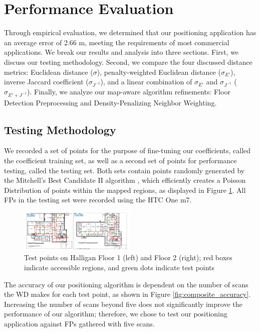 \documentclass[conference]{IEEEtran}
\begin{document}
\section{Performance Evaluation}

Through empirical evaluation, we determined that our positioning application has an average error of 2.66 m, meeting the requirements of most commercial applications. We break our results and analysis into three sections. First, we discuss our testing methodology. Second, we compare the four discussed distance metrics: Euclidean distance ($\sigma$), penalty-weighted Euclidean distance ($\sigma_{E'}$), inverse Jaccard coefficient ($\sigma_{J^{-1}}$), and a linear combination of $\sigma_{E'}$ and $\sigma_{J^{-1}}$ ($\sigma_{E' + J^{-1}}$). Finally, we analyze our map-aware algorithm refinements: Floor Detection Preprocessing and Density-Penalizing Neighbor Weighting.

\subsection{Testing Methodology}
We recorded a set of points for the purpose of fine-tuning our coefficients, called the coefficient training set, as well as a second set of points for performance testing, called the testing set. Both sets contain points randomly generated by the Mitchell's Best Candidate II algorithm \cite{Machaj}, which efficiently creates a Poisson Distribution of points within the mapped regions, as displayed in Figure \ref{fig:test_points}. All FPs in the testing set were recorded using the HTC One m7. 

\begin{figure}[t!]
  \centering
    \includegraphics[width=0.5\textwidth]{testpoints}
   \caption{Test points on Halligan Floor 1 (left) and Floor 2 (right); red boxes indicate accessible regions, and green dots indicate test points}
   \label{fig:test_points}
\end{figure}

The accuracy of our positioning algorithm is dependent on the number of scans the WD makes for each test point, as shown in Figure \ref{fig:composite_accuracy}. Increasing the number of scans beyond five does not significantly improve the performance of our algorithm; therefore, we chose to test our positioning application against FPs gathered with five scans.
\end{document}
